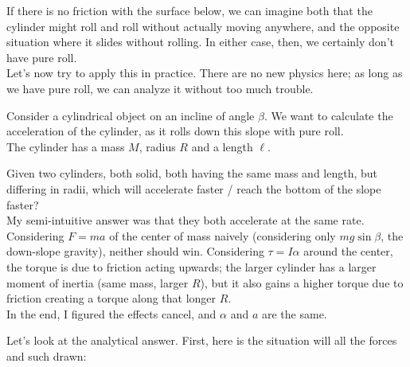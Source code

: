 If there is no friction with the surface below, we can imagine both that the cylinder might roll and roll without actually moving anywhere, and the opposite situation where it slides without rolling. In either case, then, we certainly don't have pure roll.\\
Let's now try to apply this in practice. There are no new physics here; as long as we have pure roll, we can analyze it without too much trouble.

Consider a cylindrical object on an incline of angle $\beta$. We want to calculate the acceleration of the cylinder, as it rolls down this slope with pure roll.\\
The cylinder has a mass $M$, radius $R$ and a length $\ell$.

Given two cylinders, both solid, both having the same mass and length, but differing in radii, which will accelerate faster / reach the bottom of the slope faster?\\
My semi-intuitive answer was that they both accelerate at the same rate. Considering $F = ma$ of the center of mass naively (considering only $m g \sin \beta$, the down-slope gravity), neither should win. Considering $\tau = I \alpha$ around the center, the torque is due to friction acting upwards; the larger cylinder has a larger moment of inertia (same mass, larger $R$), but it also gains a higher torque due to friction creating a torque along that longer $R$.\\
In the end, I figured the effects cancel, and $\alpha$ and $a$ are the same.

Let's look at the analytical answer. First, here is the situation will all the forces and such drawn:

\begin{figure}[H]
  \centering
\end{figure}

